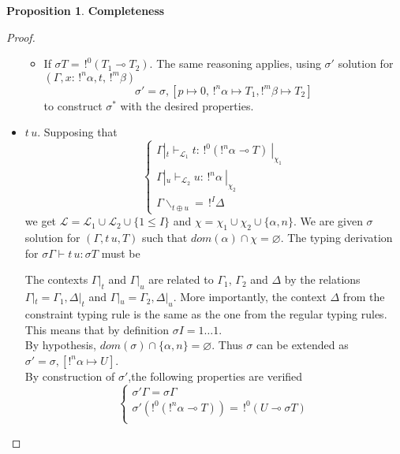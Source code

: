 \documentclass[10pt]{article}
\theoremstyle{plain}
\theoremstyle{definition}
\newtheorem{prop}{Proposition}[section]
\begin{document}
\begin{prop}{\bf Completeness}
\begin{proof}
\begin{itemize}
\begin{itemize}
			\item If $\sigma T = \,!^0 (T_1 \multimap T_2)$.
				The same reasoning applies, using $\sigma'$ solution for $(\Gamma,x : \,!^n\alpha, t, \,!^m\beta)$
					$$\sigma' = \sigma, [p \mapsto 0, \,!^n\alpha \mapsto T_1, !^m\beta \mapsto T_2]$$
				to construct $\sigma^*$ with the desired properties.
			\end{itemize}
		
		\item $t \, u$. Supposing that
			$$\left\{ \begin{array}{l}
				\Gamma|_t \vdash_{\mathcal{L}_1} t : \,!^0(!^n\alpha \multimap T) ~|_{\chi_1} \\
				\Gamma|_u \vdash_{\mathcal{L}_2} u : \,!^n\alpha ~|_{\chi_2} \\
				\Gamma\backslash_{t \oplus u} = \,!^I\Delta
			\end{array} \right.$$
			we get $\mathcal{L} = \mathcal{L}_1 \cup \mathcal{L}_2 \cup \{ 1 \le I \}$ and
			$\chi = \chi_1 \cup \chi_2 \cup \{ \alpha, n\}$. We are given $\sigma$ solution for $(\Gamma, t \, u, T)$ such that
			$dom(\alpha) \cap \chi = \varnothing$.
			The typing derivation for $\sigma \Gamma \vdash t \, u : \sigma T$ must be
				\begin{prooftree}
				\end{prooftree}
			The contexts $\Gamma|_t$ and $\Gamma|_u$ are related to $\Gamma_1$, $\Gamma_2$ and $\Delta$ by the relations
			$\Gamma|_t = \Gamma_1, \Delta|_t$ and $\Gamma|_u = \Gamma_2, \Delta|_u$. More importantly, the context
			$\Delta$ from the constraint typing rule is the same as the one from the regular typing rules. This means
			that by definition $\sigma I = 1 \dots 1$. \\
			By hypothesis, $dom(\sigma) \cap \{ \alpha, n \} = \varnothing$. Thus $\sigma$ can be extended as
			$\sigma' = \sigma, [!^n\alpha \mapsto U]$. \\
			By construction of $\sigma'$,the following properties are verified
				$$\left\{ \begin{array}{l}
									   \sigma' \Gamma = \sigma \Gamma \\
									   \sigma'(!^0(!^n \alpha \multimap T)) = \,!^0 (U \multimap \sigma T) \\

\end{array}$$
\end{itemize}
\end{proof}
\end{prop}
\end{document}

